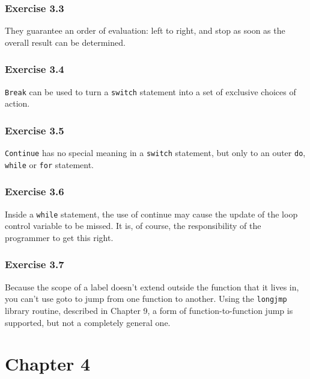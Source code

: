   

  \subsubsection*{Exercise 3.3}

   They guarantee an order of evaluation: left to right, and stop as soon as
    the overall result can be determined.


  

  \subsubsection*{Exercise 3.4}

   \texttt{Break} can be used to turn a \texttt{switch} statement
    into a set of exclusive choices of action.


  

  \subsubsection*{Exercise 3.5}

   \texttt{Continue} has no special meaning in a \texttt{switch}
    statement, but only to an outer \texttt{do}, \texttt{while} or
    \texttt{for} statement.


  

  \subsubsection*{Exercise 3.6}

   Inside a \texttt{while} statement, the use of continue may cause the
    update of the loop control variable to be missed. It is, of course, the
    responsibility of the programmer to get this right.


  

  \subsubsection*{Exercise 3.7}

   Because the scope of a label doesn't extend outside the function that it
    lives in, you can't use goto to jump from one function to another. Using
    the \texttt{longjmp} library routine, described in Chapter 9, a form of function-to-function jump is supported, but not
    a completely general one.


  

 
        \section*{Chapter 4}
        

